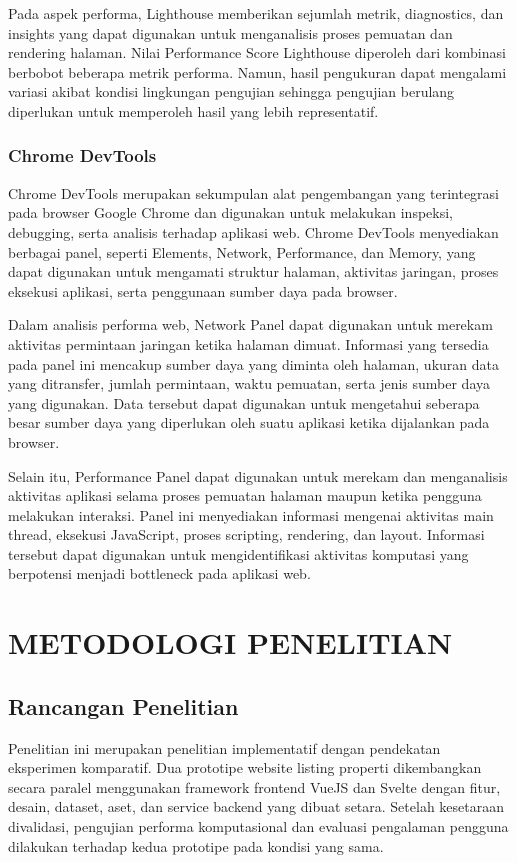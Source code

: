 \documentclass[12pt,a4paper]{report}
\begin{document}
Pada aspek performa, Lighthouse memberikan sejumlah metrik, diagnostics, dan insights yang dapat digunakan untuk menganalisis proses pemuatan dan rendering halaman. Nilai Performance Score Lighthouse diperoleh dari kombinasi berbobot beberapa metrik performa. Namun, hasil pengukuran dapat mengalami variasi akibat kondisi lingkungan pengujian sehingga pengujian berulang diperlukan untuk memperoleh hasil yang lebih representatif.

\subsection{Chrome DevTools}
Chrome DevTools merupakan sekumpulan alat pengembangan yang terintegrasi pada browser Google Chrome dan digunakan untuk melakukan inspeksi, debugging, serta analisis terhadap aplikasi web. Chrome DevTools menyediakan berbagai panel, seperti Elements, Network, Performance, dan Memory, yang dapat digunakan untuk mengamati struktur halaman, aktivitas jaringan, proses eksekusi aplikasi, serta penggunaan sumber daya pada browser.

Dalam analisis performa web, Network Panel dapat digunakan untuk merekam aktivitas permintaan jaringan ketika halaman dimuat. Informasi yang tersedia pada panel ini mencakup sumber daya yang diminta oleh halaman, ukuran data yang ditransfer, jumlah permintaan, waktu pemuatan, serta jenis sumber daya yang digunakan. Data tersebut dapat digunakan untuk mengetahui seberapa besar sumber daya yang diperlukan oleh suatu aplikasi ketika dijalankan pada browser.

Selain itu, Performance Panel dapat digunakan untuk merekam dan menganalisis aktivitas aplikasi selama proses pemuatan halaman maupun ketika pengguna melakukan interaksi. Panel ini menyediakan informasi mengenai aktivitas main thread, eksekusi JavaScript, proses scripting, rendering, dan layout. Informasi tersebut dapat digunakan untuk mengidentifikasi aktivitas komputasi yang berpotensi menjadi bottleneck pada aplikasi web.

\chapter{METODOLOGI PENELITIAN}

\section{Rancangan Penelitian}
\label{sec:rancangan-penelitian}
Penelitian ini merupakan penelitian implementatif dengan pendekatan eksperimen komparatif. Dua prototipe website listing properti dikembangkan secara paralel menggunakan framework frontend VueJS dan Svelte dengan fitur, desain, dataset, aset, dan service backend yang dibuat setara. Setelah kesetaraan divalidasi, pengujian performa komputasional dan evaluasi pengalaman pengguna dilakukan terhadap kedua prototipe pada kondisi yang sama.
\end{document}
